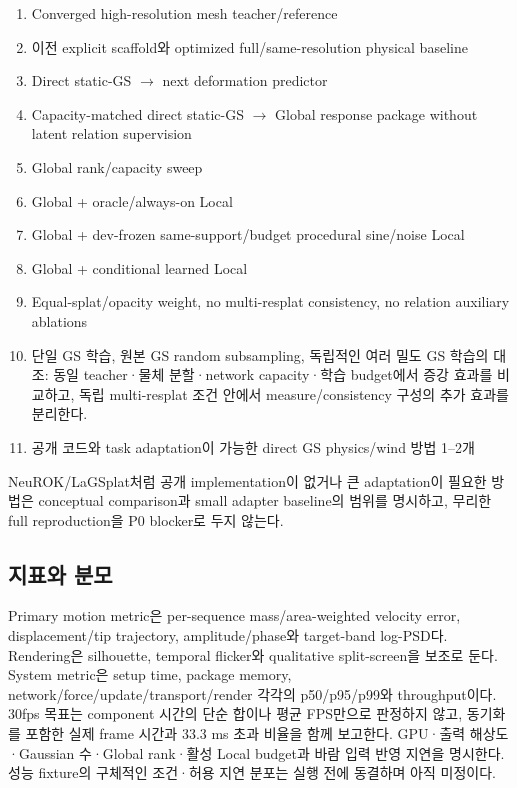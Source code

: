 \documentclass[11pt]{article}
\begin{document}
\begin{enumerate}
  \item Converged high-resolution mesh teacher/reference
  \item 이전 explicit scaffold와 optimized full/same-resolution physical baseline
  \item Direct static-GS \(\rightarrow\) next deformation predictor
  \item Capacity-matched direct static-GS \(\rightarrow\) Global response package without latent relation supervision
  \item Global rank/capacity sweep
  \item Global + oracle/always-on Local
  \item Global + dev-frozen same-support/budget procedural sine/noise Local
  \item Global + conditional learned Local
  \item Equal-splat/opacity weight, no multi-resplat consistency, no relation auxiliary ablations
  \item 단일 GS 학습, 원본 GS random subsampling, 독립적인 여러 밀도 GS 학습의 대조:
  동일 teacher·물체 분할·network capacity·학습 budget에서 증강 효과를 비교하고,
  독립 multi-resplat 조건 안에서 measure/consistency 구성의 추가 효과를 분리한다.
  \item 공개 코드와 task adaptation이 가능한 direct GS physics/wind 방법 1--2개
\end{enumerate}
NeuROK/LaGSplat처럼 공개 implementation이 없거나 큰 adaptation이 필요한 방법은 conceptual comparison과
small adapter baseline의 범위를 명시하고, 무리한 full reproduction을 P0 blocker로 두지 않는다.

\subsection{지표와 분모}

Primary motion metric은 per-sequence mass/area-weighted velocity error, displacement/tip trajectory,
amplitude/phase와 target-band log-PSD다. Rendering은 silhouette, temporal flicker와 qualitative split-screen을 보조로 둔다.
System metric은 setup time, package memory, network/force/update/transport/render 각각의 p50/p95/p99와 throughput이다.
30fps 목표는 component 시간의 단순 합이나 평균 FPS만으로 판정하지 않고, 동기화를 포함한 실제 frame 시간과
33.3 ms 초과 비율을 함께 보고한다. GPU·출력 해상도·Gaussian 수·Global rank·활성 Local budget과
바람 입력 반영 지연을 명시한다. 성능 fixture의 구체적인 조건·허용 지연 분포는 실행 전에 동결하며 아직 미정이다.
\end{document}
